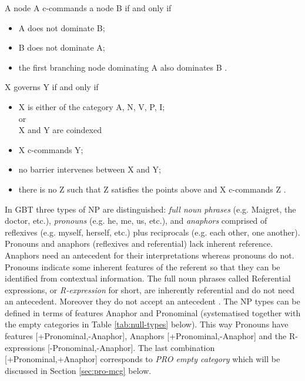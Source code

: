     \begin{definition}[c-command]\label{def:c-command}
        A node A c-commands a node B if and only if
        \begin{itemize}
            \item A does not dominate B;
            \item B does not dominate A;
            \item the first branching node dominating A also dominates B \citep[212]{Haegeman1991}.
        \end{itemize}
    \end{definition}
    
    \begin{definition}[Government]\label{def:government1}
        X governs Y if and only if
        \begin{itemize}
            \item X is either of the category A, N, V, P, I; \\
                or \\
                X and Y are coindexed
            \item X c-commands Y;
            \item no barrier intervenes between X and Y;
            \item there is no Z such that Z satisfies the points above and X c-commands Z \citep[557]{Haegeman1991}.
        \end{itemize}
    \end{definition}

    In GBT three types of NP are distinguished: \textit{full noun phrases} (e.g. Maigret, the doctor,  etc.), \textit{pronouns} (e.g. he, me, us, etc.), and \textit{anaphors} comprised of reflexives (e.g. myself, herself, etc.) plus reciprocals (e.g. each other, one another). Pronouns and anaphors (reflexives and referential) lack inherent reference. Anaphors need an antecedent for their interpretations whereas pronouns do not. Pronouns indicate some inherent features of the referent so that they can be identified from contextual information. The full noun phrases called Referential expressions, or \textit{R-expression} for short, are inherently referential and do not need an antecedent. Moreover they do not accept an antecedent \citep[226]{Haegeman1991}. The NP types can be defined in terms of features Anaphor and Pronominal (systematised together with the empty categories in Table \ref{tab:null-types} below). This way Pronouns have features [+Pronominal,-Anaphor], Anaphors [+Pronominal,-Anaphor] and the R-expressions [-Pronominal,-Anaphor]. The last combination [+Pronominal,+Anaphor] corresponds to \textit{PRO empty category} which will be discussed in Section \ref{sec:pro-mcg} below. 

